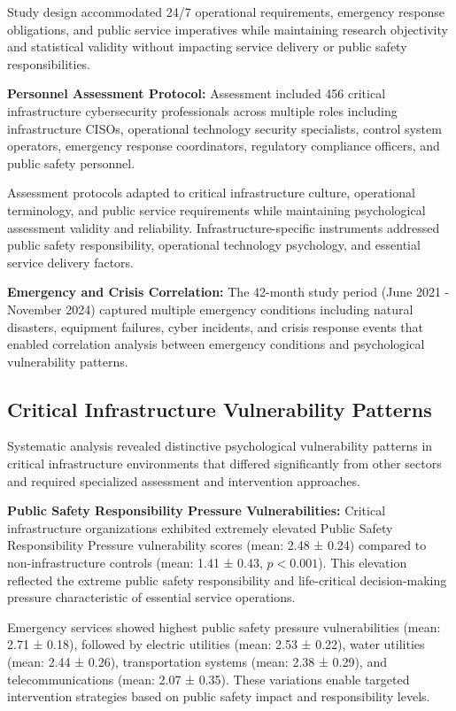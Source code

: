 \documentclass[10pt, twocolumn]{article}
\begin{document}
Study design accommodated 24/7 operational requirements, emergency response obligations, and public service imperatives while maintaining research objectivity and statistical validity without impacting service delivery or public safety responsibilities.

\textbf{Personnel Assessment Protocol:} Assessment included 456 critical infrastructure cybersecurity professionals across multiple roles including infrastructure CISOs, operational technology security specialists, control system operators, emergency response coordinators, regulatory compliance officers, and public safety personnel.

Assessment protocols adapted to critical infrastructure culture, operational terminology, and public service requirements while maintaining psychological assessment validity and reliability. Infrastructure-specific instruments addressed public safety responsibility, operational technology psychology, and essential service delivery factors.

\textbf{Emergency and Crisis Correlation:} The 42-month study period (June 2021 - November 2024) captured multiple emergency conditions including natural disasters, equipment failures, cyber incidents, and crisis response events that enabled correlation analysis between emergency conditions and psychological vulnerability patterns.

\subsection{Critical Infrastructure Vulnerability Patterns}

Systematic analysis revealed distinctive psychological vulnerability patterns in critical infrastructure environments that differed significantly from other sectors and required specialized assessment and intervention approaches.

\textbf{Public Safety Responsibility Pressure Vulnerabilities:} Critical infrastructure organizations exhibited extremely elevated Public Safety Responsibility Pressure vulnerability scores (mean: 2.48 ± 0.24) compared to non-infrastructure controls (mean: 1.41 ± 0.43, $p < 0.001$). This elevation reflected the extreme public safety responsibility and life-critical decision-making pressure characteristic of essential service operations.

Emergency services showed highest public safety pressure vulnerabilities (mean: 2.71 ± 0.18), followed by electric utilities (mean: 2.53 ± 0.22), water utilities (mean: 2.44 ± 0.26), transportation systems (mean: 2.38 ± 0.29), and telecommunications (mean: 2.07 ± 0.35). These variations enable targeted intervention strategies based on public safety impact and responsibility levels.
\end{document}
